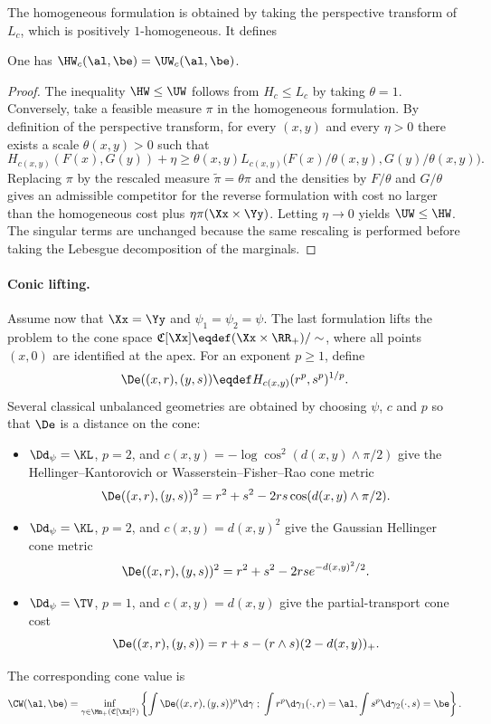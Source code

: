 The homogeneous formulation is obtained by taking the perspective transform of $L_c$,
which is positively $1$-homogeneous. It defines

\begin{prop}\label{prop-homogeneous-unbalanced}
	One has $\HW_c(\al,\be)=\UW_c(\al,\be)$.
\end{prop}

\begin{proof}
	The inequality $\HW\leq\UW$ follows from $H_c\leq L_c$ by taking $\theta=1$. Conversely, take a feasible measure $\pi$ in the homogeneous formulation. By definition of the perspective transform, for every $(x,y)$ and every $\eta>0$ there exists a scale $\theta(x,y)>0$ such that
	\[
		H_{c(x,y)}(F(x),G(y))+\eta
		\geq
		\theta(x,y)L_{c(x,y)}\big(F(x)/\theta(x,y),G(y)/\theta(x,y)\big).
	\]
	Replacing $\pi$ by the rescaled measure $\tilde\pi=\theta\pi$ and the densities by $F/\theta$ and $G/\theta$ gives an admissible competitor for the reverse formulation with cost no larger than the homogeneous cost plus $\eta\pi(\Xx\times\Yy)$. Letting $\eta\to0$ yields $\UW\leq\HW$. The singular terms are unchanged because the same rescaling is performed before taking the Lebesgue decomposition of the marginals.
\end{proof}

\paragraph{Conic lifting.}

Assume now that $\Xx=\Yy$ and $\psi_1=\psi_2=\psi$. The last formulation lifts the problem to the cone space $\mathfrak C[\Xx]\eqdef(\Xx\times\RR_+)/\sim$, where all points $(x,0)$ are identified at the apex. For an exponent $p\geq1$, define
\[
	\De((x,r),(y,s))\eqdef H_{c(x,y)}(r^p,s^p)^{1/p}.
\]
Several classical unbalanced geometries are obtained by choosing $\psi$, $c$ and $p$ so that $\De$ is a distance on the cone:
\begin{itemize}
	\item $\Dd_\psi=\KL$, $p=2$, and $c(x,y)=-\log\cos^2(d(x,y)\wedge\pi/2)$ give the Hellinger--Kantorovich or Wasserstein--Fisher--Rao cone metric
	\[
		\De((x,r),(y,s))^2=r^2+s^2-2rs\cos(d(x,y)\wedge\pi/2).
	\]
	\item $\Dd_\psi=\KL$, $p=2$, and $c(x,y)=d(x,y)^2$ give the Gaussian Hellinger cone metric
	\[
		\De((x,r),(y,s))^2=r^2+s^2-2rs e^{-d(x,y)^2/2}.
	\]
	\item $\Dd_\psi=\TV$, $p=1$, and $c(x,y)=d(x,y)$ give the partial-transport cone cost
	\[
		\De((x,r),(y,s))=r+s-(r\wedge s)(2-d(x,y))_+.
	\]
\end{itemize}
The corresponding cone value is
\[
	\CW(\al,\be)
	=
	\inf_{\gamma\in\Mm_+(\mathfrak C[\Xx]^2)}
	\left\{
	\int \De((x,r),(y,s))^p\d\gamma
	\; ; \;
	\int r^p\d\gamma_1(\cdot,r)=\al,
	\int s^p\d\gamma_2(\cdot,s)=\be
	\right\}.
\]

